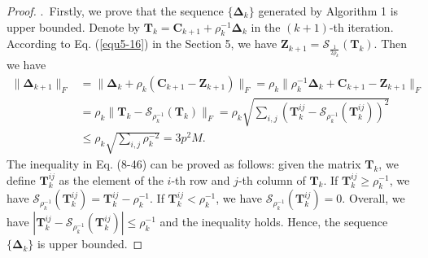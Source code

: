 \vspace{-6mm}
\begin{proof}
$ $.\ Firstly, we prove that the sequence $\{\bm{\Delta}_{k}\}$ generated by Algorithm 1 is upper bounded. Denote by $\bm{T}_{k}=\bm{C}_{k+1}+\rho_{k}^{-1}\bm{\Delta}_{k}$ in the $(k+1)$-th iteration. According to Eq. (\ref{equ5-16}) in the Section 5, we have $\bm{Z}_{k+1}=\mathcal{S}_{\frac{1}{2\rho_{k}}}(\bm{T}_{k})$. 
Then we have 
\begin{align}
\|
\bm{\Delta}_{k+1}
\|_{F}
&
=
\|
\bm{\Delta}_{k}
+
\rho_{k}
(\bm{C}_{k+1}-\bm{Z}_{k+1})
\|_{F}
=
\rho_{k}\|
\rho_{k}^{-1}
\bm{\Delta}_{k}
+
\bm{C}_{k+1}
-
\bm{Z}_{k+1}
\|_{F}
\\
&
=
\rho_{k}\|
\bm{T}_{k}
-
\mathcal{S}_{\rho_{k}^{-1}}(\bm{T}_{k})
\|_{F}
=
\rho_{k}
\sqrt{\sum_{i,j}(\bm{T}_{k}^{ij}-\mathcal{S}_{\rho_{k}^{-1}}(\bm{T}_{k}^{ij}))^{2}}
\\
&
\le
\rho_{k}
\sqrt{\sum_{i,j}\rho_{k}^{-2}}
=
3p^2M.
\end{align}
The inequality in Eq. (8-46) can be proved as follows: given the matrix $\bm{T}_{k}$, we define $\bm{T}_{k}^{ij}$ as the element of the $i$-th row and $j$-th column of $\bm{T}_{k}$. If $\bm{T}_{k}^{ij}\ge\rho_{k}^{-1}$, we have $\mathcal{S}_{\rho_{k}^{-1}}(\bm{T}_{k}^{ij})=\bm{T}_{k}^{ij}-\rho_{k}^{-1}$. If $\bm{T}_{k}^{ij}<\rho_{k}^{-1}$, we have $\mathcal{S}_{\rho_{k}^{-1}}(\bm{T}_{k}^{ij})=0$. Overall, we have $|\bm{T}_{k}^{ij}-\mathcal{S}_{\rho_{k}^{-1}}(\bm{T}_{k}^{ij})|\le\rho_{k}^{-1}$ and the inequality holds. Hence, the sequence $\{\bm{\Delta}_{k}\}$ is upper bounded.


\end{proof}

